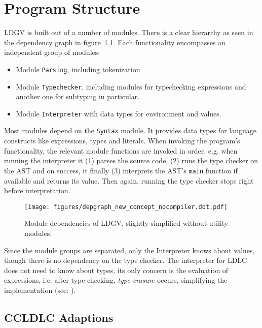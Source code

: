 \chapter{Program Structure}\label{chap:program-structure}

LDGV is built out of a number of modules. There is a clear hierarchy as seen in the dependency graph in figure~\ref{fig:dependency-graph}. Each functionality encompasses an independent group of modules:

\begin{itemize}
 \item Module \texttt{Parsing}, including tokenization
 \item Module \texttt{Typechecker}, including modules for typechecking expressions and another one for subtyping in particular.
 \item Module \texttt{Interpreter} with data types for environment and values.
\end{itemize}

Most modules depend on the \texttt{Syntax} module. It provides data types for language constructs like expressions, types and literals. When invoking the program's functionality, the relevant module functions are invoked in order, e.g. when running the interpreter it (1) parses the source code, (2) runs the type checker on the AST and on success, it finally (3) interprets the AST's \texttt{main} function if available and returns its value.   Then again, running the type checker stops right before interpretation.

\begin{figure}
 \centering
 \texttt{[image: figures/depgraph\_new\_concept\_nocompiler.dot.pdf]}
 \caption{Module dependencies of LDGV, slightly simplified without utility modules.}
 \label{fig:dependency-graph}
\end{figure}

Since the module groups are separated, only the Interpreter knows about values, though there is no dependency on the type checker. The interpreter for LDLC does not need to know about types, its only concern is the evaluation of expressions, i.e. after type checking, \emph{type erasure} occurs, simplifying the implementation (see: \cite{crary2002}).

\section{CCLDLC Adaptions}

